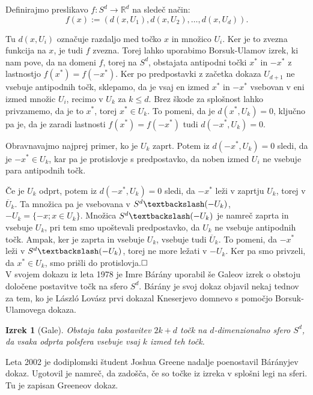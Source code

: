 \documentclass[a4paper,12pt]{article}
\def\qed{$\hfill\Box$}   %
\newtheorem{izrek}{Izrek}
\begin{document}
Definirajmo preslikavo $f:S^d \rightarrow \mathbb{R}^d$ na sledeč način:
$$f(x) := (d(x,U_1), d(x,U_2), \ldots, d(x,U_d)).$$

Tu $d(x,U_i)$ označuje razdaljo med točko $x$ in množico $U_i$. Ker je to zvezna funkcija na $x$, je tudi $f$ zvezna. Torej lahko uporabimo Borsuk-Ulamov izrek, ki nam pove, da na domeni $f$, torej na $S^d$, obstajata antipodni točki $x^*$ in $-x^*$ z lastnostjo $f(x^*)=f(-x^*)$. Ker po predpostavki z začetka dokaza $U_{d+1}$ ne vsebuje antipodnih točk, sklepamo, da je vsaj en izmed $x^*$ in $-x^*$ vsebovan v eni izmed množic $U_i$, recimo v $U_k$ za $k\leq d$. Brez škode za splošnost lahko privzamemo, da je to $x^*$, torej $x^* \in U_k$. To pomeni, da je $d(x^*, U_k) = 0$, ključno pa je, da je zaradi lastnosti $f(x^*)=f(-x^*)$ tudi $d(-x^*, U_k) = 0$.

Obravnavajmo najprej primer, ko je $U_k$ zaprt. Potem iz $d(-x^*, U_k) = 0$ sledi, da je $-x^* \in U_k$, kar pa je protislovje s predpostavko, da noben izmed $U_i$ ne vsebuje para antipodnih točk.

Če je $U_k$ odprt, potem iz $d(-x^*, U_k) = 0$ sledi, da $-x^*$ leži v zaprtju $U_k$, torej v $\overline U_k$. Ta množica pa je vsebovana v $S^d\textbackslash(-U_k)$, \mbox{$-U_k = \{-x;x \in U_k\}$}. Množica $S^d\textbackslash(-U_k)$ je namreč zaprta in vsebuje $U_k$, pri tem smo upoštevali predpostavko, da $U_k$ ne vsebuje antipodnih točk. Ampak, ker je zaprta in vsebuje $U_k$, vsebuje tudi $\overline U_k$. To pomeni, da $-x^*$ leži v  $S^d\textbackslash(-U_k)$, torej ne more ležati v $-U_k$. Ker pa smo privzeli, da $x^* \in U_k$, smo prišli do protislovja.\qed \newline \\

V svojem dokazu iz leta 1978 je Imre Bárány uporabil še Galeov izrek o obstoju določene postavitve točk na sfero $S^d$. Bárány je svoj dokaz objavil nekaj tednov za tem, ko je László Lovász prvi dokazal Kneserjevo domnevo s pomočjo Borsuk-Ulamovega dokaza.

\begin{izrek}[Gale]
Obstaja taka postavitev $2k+d$ točk na $d$-dimenzionalno sfero $S^d$, da vsaka odprta polsfera vsebuje vsaj $k$ izmed teh točk.
\end{izrek}

Leta 2002 je dodiplomski študent Joshua Greene nadalje poenostavil Bárányjev dokaz. Ugotovil je namreč, da zadošča, če so točke iz izreka v splošni legi na sferi. Tu je zapisan Greeneov dokaz.
\end{document}
